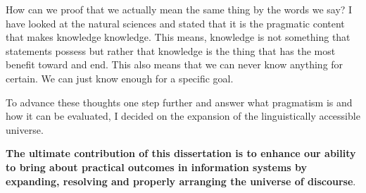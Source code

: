How can we proof that we actually mean the same thing by the words we say?
I have looked at the natural sciences and stated that it is the pragmatic content that makes knowledge knowledge.
This means, knowledge is not something that statements possess but rather that knowledge is the thing that has the most benefit toward and end.
This also means that we can never know anything for certain.
We can just know enough for a specific goal.

To advance these thoughts one step further and answer what pragmatism is and how it can be evaluated, I decided on the expansion of the linguistically accessible universe.

\textbf{The ultimate contribution of this dissertation is to enhance our ability to bring about practical outcomes in information systems by expanding, resolving and properly arranging the universe of discourse}.









